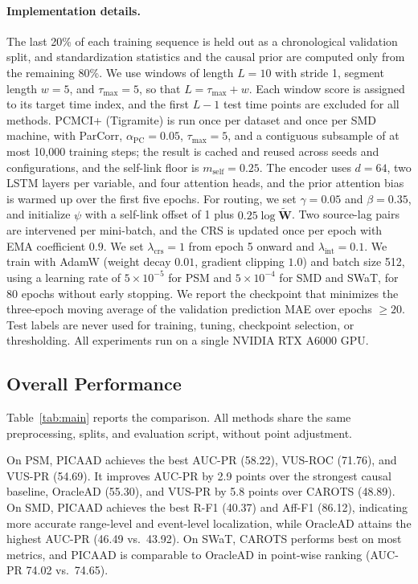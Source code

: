 \documentclass[letterpaper]{article}
\newcommand{\Wt}{\widetilde{\mathbf{W}}}
\begin{document}
\paragraph{Implementation details.}
The last 20\% of each training sequence is held out as a chronological validation split, and standardization statistics and the causal prior are computed only from the remaining 80\%. We use windows of length $L=10$ with stride 1, segment length $w=5$, and $\tau_{\max}=5$, so that $L=\tau_{\max}+w$. Each window score is assigned to its target time index, and the first $L-1$ test time points are excluded for all methods. PCMCI+ (Tigramite) is run once per dataset and once per SMD machine, with ParCorr, $\alpha_{\mathrm{PC}}=0.05$, $\tau_{\max}=5$, and a contiguous subsample of at most 10{,}000 training steps; the result is cached and reused across seeds and configurations, and the self-link floor is $m_{\mathrm{self}}=0.25$. The encoder uses $d=64$, two LSTM layers per variable, and four attention heads, and the prior attention bias is warmed up over the first five epochs. For routing, we set $\gamma=0.05$ and $\beta=0.35$, and initialize $\psi$ with a self-link offset of 1 plus $0.25\log\Wt$. Two source-lag pairs are intervened per mini-batch, and the CRS is updated once per epoch with EMA coefficient $0.9$. We set $\lambda_{\mathrm{crs}}=1$ from epoch 5 onward and $\lambda_{\mathrm{int}}=0.1$. We train with AdamW (weight decay $0.01$, gradient clipping $1.0$) and batch size 512, using a learning rate of $5\times10^{-5}$ for PSM and $5\times10^{-4}$ for SMD and SWaT, for 80 epochs without early stopping. We report the checkpoint that minimizes the three-epoch moving average of the validation prediction MAE over epochs $\ge 20$. Test labels are never used for training, tuning, checkpoint selection, or thresholding. All experiments run on a single NVIDIA RTX A6000 GPU.

\subsection{Overall Performance}

Table~\ref{tab:main} reports the comparison. All methods share the same preprocessing, splits, and evaluation script, without point adjustment.

On PSM, PICAAD achieves the best AUC-PR (58.22), VUS-ROC (71.76), and VUS-PR (54.69). It improves AUC-PR by 2.9 points over the strongest causal baseline, OracleAD (55.30), and VUS-PR by 5.8 points over CAROTS (48.89). On SMD, PICAAD achieves the best R-F1 (40.37) and Aff-F1 (86.12), indicating more accurate range-level and event-level localization, while OracleAD attains the highest AUC-PR (46.49 vs.\ 43.92). On SWaT, CAROTS performs best on most metrics, and PICAAD is comparable to OracleAD in point-wise ranking (AUC-PR 74.02 vs.\ 74.65).
\end{document}
